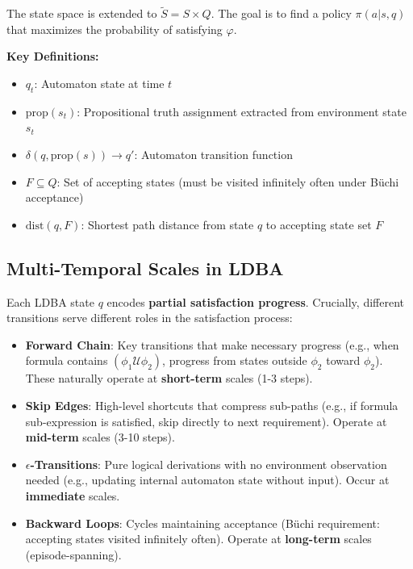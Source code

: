 \documentclass[conference]{IEEEtran}
\begin{document}
The state space is extended to $\tilde{S} = S \times Q$. The goal is to find a policy $\pi(a|s, q)$ that maximizes the probability of satisfying $\varphi$.

\textbf{Key Definitions:}
\begin{itemize}
    \item $q_t$: Automaton state at time $t$
    \item $\text{prop}(s_t)$: Propositional truth assignment extracted from environment state $s_t$
    \item $\delta(q, \text{prop}(s)) \rightarrow q'$: Automaton transition function
    \item $F \subseteq Q$: Set of accepting states (must be visited infinitely often under Büchi acceptance)
    \item $\text{dist}(q, F)$: Shortest path distance from state $q$ to accepting state set $F$
\end{itemize}

\subsection{Multi-Temporal Scales in LDBA}

Each LDBA state $q$ encodes \textbf{partial satisfaction progress}. Crucially, different transitions serve different roles in the satisfaction process:

\begin{itemize}
    \item \textbf{Forward Chain}: Key transitions that make necessary progress (e.g., when formula contains $(\phi_1 \mathcal{U} \phi_2)$, progress from states outside $\phi_2$ toward $\phi_2$). These naturally operate at \textbf{short-term} scales (1-3 steps).
    \item \textbf{Skip Edges}: High-level shortcuts that compress sub-paths (e.g., if formula sub-expression is satisfied, skip directly to next requirement). Operate at \textbf{mid-term} scales (3-10 steps).
    \item \textbf{$\epsilon$-Transitions}: Pure logical derivations with no environment observation needed (e.g., updating internal automaton state without input). Occur at \textbf{immediate} scales.
    \item \textbf{Backward Loops}: Cycles maintaining acceptance (Büchi requirement: accepting states visited infinitely often). Operate at \textbf{long-term} scales (episode-spanning).
\end{itemize}
\end{document}
